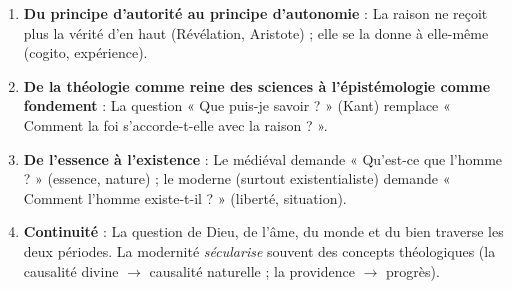 \documentclass[11pt]{article}
\begin{document}
\begin{aretenir}
\begin{enumerate}
\item \textbf{Du principe d'autorité au principe d'autonomie} : La raison ne reçoit plus la vérité d'en haut (Révélation, Aristote) ; elle se la donne à elle-même (cogito, expérience).
\item \textbf{De la théologie comme reine des sciences à l'épistémologie comme fondement} : La question « Que puis-je savoir ? » (Kant) remplace « Comment la foi s'accorde-t-elle avec la raison ? ».
\item \textbf{De l'essence à l'existence} : Le médiéval demande « Qu'est-ce que l'homme ? » (essence, nature) ; le moderne (surtout existentialiste) demande « Comment l'homme existe-t-il ? » (liberté, situation).
\item \textbf{Continuité} : La question de Dieu, de l'âme, du monde et du bien traverse les deux périodes. La modernité \emph{sécularise} souvent des concepts théologiques (la causalité divine $\to$ causalité naturelle ; la providence $\to$ progrès).
\end{enumerate}
\end{aretenir}
\end{document}

